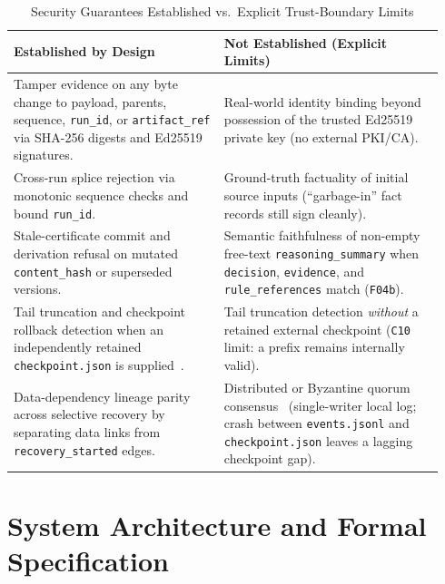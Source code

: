 \documentclass[11pt,a4paper]{article}
\begin{document}
\begin{table}[t]
\centering
\caption{Security Guarantees Established vs.\ Explicit Trust-Boundary Limits}
\label{tab:trust-boundary}
\small
\begin{tabular}{@{}p{0.46\linewidth}p{0.48\linewidth}@{}}
\toprule
\textbf{Established by Design} & \textbf{Not Established (Explicit Limits)} \\
\midrule
Tamper evidence on any byte change to payload, parents, sequence, \texttt{run\_id}, or \texttt{artifact\_ref} via SHA-256 digests and Ed25519 signatures. & Real-world identity binding beyond possession of the trusted Ed25519 private key (no external PKI/CA). \\
Cross-run splice rejection via monotonic sequence checks and bound \texttt{run\_id}. & Ground-truth factuality of initial source inputs (``garbage-in'' fact records still sign cleanly). \\
Stale-certificate commit and derivation refusal on mutated \texttt{content\_hash} or superseded versions. & Semantic faithfulness of non-empty free-text \texttt{reasoning\_summary} when \texttt{decision}, \texttt{evidence}, and \texttt{rule\_references} match (\texttt{F04b}). \\
Tail truncation and checkpoint rollback detection when an independently retained \texttt{checkpoint.json} is supplied~\citep{crosby2009tamper,laurie2013rfc6962}. & Tail truncation detection \emph{without} a retained external checkpoint (\texttt{C10} limit: a prefix remains internally valid). \\
Data-dependency lineage parity across selective recovery by separating data links from \texttt{recovery\_started} edges. & Distributed or Byzantine quorum consensus~\citep{castro1999pbft} (single-writer local log; crash between \texttt{events.jsonl} and \texttt{checkpoint.json} leaves a lagging checkpoint gap). \\
\bottomrule
\end{tabular}
\end{table}

\section{System Architecture and Formal Specification}
\end{document}
